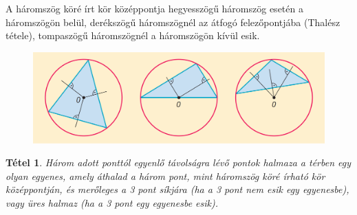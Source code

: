 \documentclass[12pt,a4paper]{article}
\newtheorem{theorem}{Tétel} [section]
\begin{document}
A háromszög köré írt kör középpontja hegyesszögű háromszög esetén a háromszögön belül, derékszögű háromszögnél az átfogó felezőpontjába (Thalész tétele), tompaszögű háromszögnél a háromszögön kívül esik.
\begin{figure}[h]
\centering
\includegraphics[scale=0.2]{geometry/korul_irt_kor_esetek}
\end{figure}

\begin{theorem}
Három adott ponttól egyenlő távolságra lévő pontok halmaza a térben egy olyan egyenes, amely áthalad a három pont, mint háromszög köré írható kör középpontján, és merőleges a 3 pont síkjára (ha a 3 pont nem esik egy egyenesbe), vagy üres halmaz (ha a 3 pont egy egyenesbe esik).
\end{theorem}
\newpage
\end{document}

